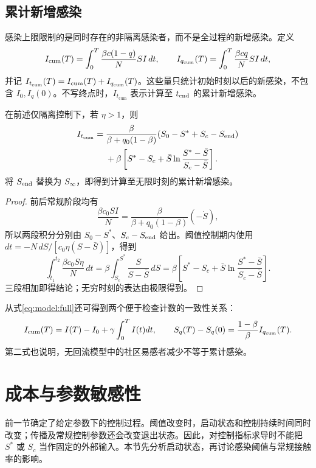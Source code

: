 \documentclass[lang=cn,a4paper,newtx]{elegantpaper}
\numberwithin{equation}{section}
\theoremstyle{plain}
\newcommand{\Itcum}{I_{t_{\mathrm{cum}}}}
\begin{document}
\subsection{累计新增感染}
感染上限限制的是同时存在的非隔离感染者，而不是全过程的新增感染。定义
\[
I_{\rm cum}(T)=\int_0^T\frac{\beta c(1-q)}{N}SI\,dt,\qquad
I_{q_{\rm cum}}(T)=\int_0^T\frac{\beta cq}{N}SI\,dt,
\]
并记 $\Itcum(T)=I_{\rm cum}(T)+I_{q_{\rm cum}}(T)$。这些量只统计初始时刻以后的新感染，不包含 $I_0,I_q(0)$。不写终点时，$\Itcum$ 表示计算至 $t_{\rm end}$ 的累计新增感染。
\begin{theorem}
\label{thm:s1:Itcum}
在前述仅隔离控制下，若 $\eta>1$，则
\begin{equation}
\begin{split}
\Itcum={}&\frac{\beta}{\beta+q_0(1-\beta)}(S_0-S^*+S_c-S_{\rm end})\\
&+\beta\left[S^*-S_c+\bar S\ln\frac{S^*-\bar S}{S_c-\bar S}\right].
\end{split}
\label{eq:s1:cumulative}
\end{equation}
将 $S_{\rm end}$ 替换为 $S_\infty$，即得到计算至无限时刻的累计新增感染。
\end{theorem}
\begin{proof}
前后常规阶段均有
\[
\frac{\beta c_0SI}{N}=\frac{\beta}{\beta+q_0(1-\beta)}(-\dot S),
\]
所以两段积分分别由 $S_0-S^*$、$S_c-S_{\rm end}$ 给出。阈值控制期内使用 $dt=-N\,dS/[c_0\eta(S-\bar S)]$，得到
\[
\int_{t_1}^{t_2}\frac{\beta c_0S\eta}{N}\,dt
=\beta\int_{S_c}^{S^*}\frac{S}{S-\bar S}\,dS
=\beta\left[S^*-S_c+\bar S\ln\frac{S^*-\bar S}{S_c-\bar S}\right].
\]
三段相加即得结论；无穷时刻的表达由极限得到。
\end{proof}
从式\eqref{eq:model:full}还可得到两个便于检查计数的一致性关系：
\begin{equation}
I_{\rm cum}(T)=I(T)-I_0+\gamma\int_0^T I(t)dt,
\qquad
S_q(T)-S_q(0)=\frac{1-\beta}{\beta}I_{q_{\rm cum}}(T).
\label{eq:count-identities}
\end{equation}
第二式也说明，无回流模型中的社区易感者减少不等于累计感染。


\section{成本与参数敏感性}
\label{sec:cost}
前一节确定了给定参数下的控制过程。阈值改变时，启动状态和控制持续时间同时改变；传播及常规控制参数还会改变退出状态。因此，对控制指标求导时不能把 $S^*$ 或 $S_c$ 当作固定的外部输入。本节先分析启动状态，再讨论感染阈值与常规接触率的影响。
\end{document}
